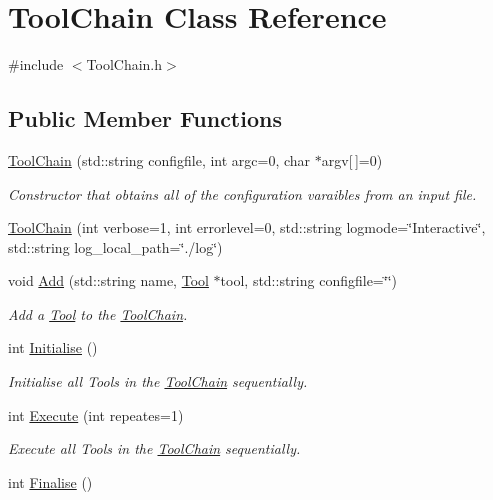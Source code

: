 \hypertarget{classToolChain}{\section{Tool\-Chain Class Reference}
\label{classToolChain}
}


{\ttfamily \#include $<$Tool\-Chain.\-h$>$}

\subsection*{Public Member Functions}
\begin{DoxyCompactItemize}
\item 
\hyperlink{classToolChain_a133e224899a743ee4a679396f8569bf9}{Tool\-Chain} (std\-::string configfile, int argc=0, char $\ast$argv\mbox{[}$\,$\mbox{]}=0)
\begin{DoxyCompactList}\small\item\em Constructor that obtains all of the configuration varaibles from an input file. \end{DoxyCompactList}\item 
\hyperlink{classToolChain_aa55cb52b21892009313568f60d5dcdb6}{Tool\-Chain} (int verbose=1, int errorlevel=0, std\-::string logmode=\char`\"{}Interactive\char`\"{}, std\-::string log\-\_\-local\-\_\-path=\char`\"{}./log\char`\"{})
\item 
void \hyperlink{classToolChain_a4da0c02154a0597704e58836d6607e61}{Add} (std\-::string name, \hyperlink{classTool}{Tool} $\ast$tool, std\-::string configfile=\char`\"{}\char`\"{})
\begin{DoxyCompactList}\small\item\em Add a \hyperlink{classTool}{Tool} to the \hyperlink{classToolChain}{Tool\-Chain}. \end{DoxyCompactList}\item 
\hypertarget{classToolChain_a341f343926341b82a29c586a7b9683af}{int \hyperlink{classToolChain_a341f343926341b82a29c586a7b9683af}{Initialise} ()}\label{classToolChain_a341f343926341b82a29c586a7b9683af}

\begin{DoxyCompactList}\small\item\em Initialise all Tools in the \hyperlink{classToolChain}{Tool\-Chain} sequentially. \end{DoxyCompactList}\item 
int \hyperlink{classToolChain_a303e299293fd4d3a5e91865e04898e52}{Execute} (int repeates=1)
\begin{DoxyCompactList}\small\item\em Execute all Tools in the \hyperlink{classToolChain}{Tool\-Chain} sequentially. \end{DoxyCompactList}\item 
\hypertarget{classToolChain_a3828756135773fb9ca4b361a47296dd9}{int \hyperlink{classToolChain_a3828756135773fb9ca4b361a47296dd9}{Finalise} ()}\label{classToolChain_a3828756135773fb9ca4b361a47296dd9}


\end{DoxyCompactItemize}
